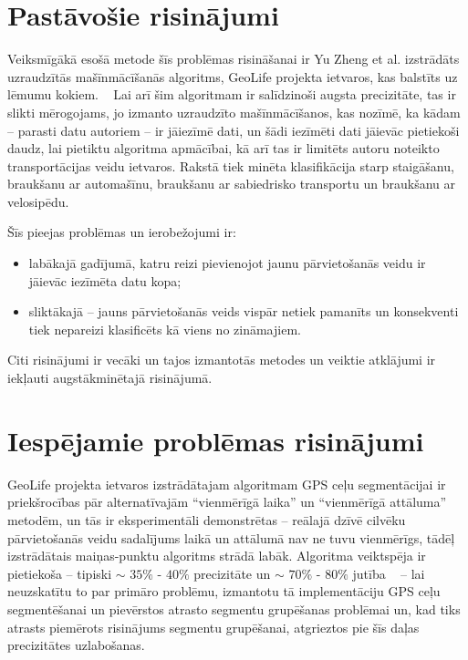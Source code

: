 \documentclass{ludis}
\begin{document}
\section{Pastāvošie risinājumi}
Veiksmīgākā esošā metode šīs problēmas risināšanai ir Yu Zheng et al. izstrā\-dāts uzraudzītās
mašīnmācīšanās algoritms, GeoLife projekta ietvaros, kas balstīts uz lēmumu 
kokiem. ~\cite{zheng_gps_segmentation} Lai arī šim algoritmam ir salīdzinoši augsta precizitāte, 
tas ir slikti mērog\-ojams, jo izmanto uzraudzīto mašīn\-mācīšanos, kas nozīmē, ka kādam -- parasti
datu autoriem -- ir jāiezīmē dati, un šādi iezīmēti dati jāievāc pietie\-koši daudz, lai pietiktu
algoritma apmācībai, kā arī tas ir limitēts autoru 
noteikto transportācijas veidu iet\-varos. Rakstā tiek minēta klasifikācija starp staigāšanu, 
braukšanu ar \linebreak automašīnu, braukšanu ar sabiedrisko transportu un braukšanu ar velo\-sipēdu. 

Šīs pieejas problēmas un ierobežojumi ir:
\begin{itemize}
\item labākajā gadījumā, katru reizi pievienojot jaunu pārvietošanās veidu ir jāievāc iezīmēta datu 
  kopa;
\item sliktākajā -- jauns pārvietošanās veids vispār netiek pamanīts un \linebreak 
  konsekventi tiek nepareizi klasificēts kā viens no zināmajiem.
\end{itemize}

Citi risinājumi ir vecāki un tajos izmantotās metodes un veiktie atklājumi ir iekļauti
augstākminētajā risinājumā.

\section{Iespējamie problēmas risinājumi}
GeoLife projekta ietvaros izstrādātajam algoritmam GPS ceļu segmentācijai ir priekšrocības 
pār alternatīvajām ``vienmērīgā laika'' un ``vienmērīgā attāluma'' metodēm, un tās ir
eksperimentāli demonstrētas -- reālajā dzīvē cilvēku pārvietošanās veidu sadalījums laikā 
un attālumā nav ne tuvu vienmērīgs, tādēļ izstrādātais maiņas-punktu algoritms strādā labāk.
Algoritma veiktspēja ir pietiekoša -- tipiski $\sim$ $35\%$ - $40\%$
precizitāte un $\sim$ $70\%$ - $80\%$ jutība ~\cite{zheng_gps_segmentation} -- 
lai neuzskatītu to par primāro problēmu, izmantotu tā implementāciju GPS ceļu segmentēšanai 
un pievērstos atrasto segmentu grupēšanas problēmai un, kad tiks atrasts piemērots risinājums
segmentu grupēšanai, atgrieztos pie šīs daļas precizitātes uzlabošanas.
\end{document}
